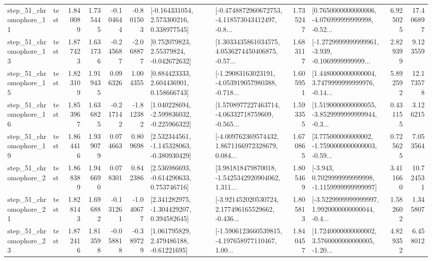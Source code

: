 \begin{tabular}{llrrrrllrlrr}
   step\_51\_chromophore\_11 &      test &      1.840089 &    1.735445 &     -0.104644 & -0.801503 &    [-0.164331054, 2.573300216, 0.338977545] &  [-0.4748872960672753, -4.118573043412497, -0.8... &       1.735247 &  [0.7650000000000006, -4.076999999999998, -0.52... &            6.925025 &         17.406897 \\
   step\_51\_chromophore\_13 &      test &      1.877423 &    1.631736 &     -0.245687 & -2.068877 &     [0.752079823, 2.55379824, -0.042672632] &  [1.3033435861034575, 4.0536274450406875, -0.57... &       1.683117 &  [-1.2729999999999961, -3.939, -0.1069999999999... &            2.829399 &          9.123559 \\
   step\_51\_chromophore\_15 &      test &      1.823109 &    1.919435 &      0.096326 &  1.004355 &     [0.884423333, 2.604436901, 0.158666743] &  [-1.29083163023191, -4.053919057980388, -0.718... &       1.605951 &  [1.4480000000000004, 3.7479999999999976, -0.14... &            5.892592 &         12.173578 \\
   step\_51\_chromophore\_16 &      test &      1.853967 &    1.636825 &     -0.217142 & -1.812382 &   [1.040228694, -2.599836032, -0.225966322] &  [1.5708977227463714, -4.06332718759609, -0.565... &       1.593355 &  [1.5190000000000055, -3.8529999999999944, -0.3... &            0.431155 &          3.126215 \\
   step\_51\_chromophore\_19 &      test &      1.864416 &    1.939079 &      0.074663 &  0.809698 &   [2.532344561, -1.145328063, -0.380930429] &  [-4.009762369574432, 1.8671166972328679, 0.084... &       1.670865 &  [3.775000000000002, -1.7590000000000003, -0.59... &            0.725625 &          7.053564 \\
    step\_51\_chromophore\_2 &      test &      1.868389 &    1.946690 &      0.078301 &  0.842386 &    [2.536986693, -0.614290633, 0.753746716] &  [3.981818479870018, -1.5425342920904062, 1.311... &       1.805469 &  [-3.943, 0.7029999999999998, -1.1159999999999997] &            3.411660 &         10.724531 \\
   step\_51\_chromophore\_21 &      test &      1.828143 &    1.696882 &     -0.131261 & -1.040677 &    [2.341282975, -1.304429207, 0.394582645] &  [-3.921452020530724, 2.177496165529662, -0.436... &       1.805813 &  [-3.5229999999999997, 1.9920000000000044, -0.4... &            1.582602 &          1.345807 \\
   step\_51\_chromophore\_23 &      test &      1.872416 &    1.813598 &     -0.058818 & -0.389729 &     [1.061795829, 2.479486188, -0.61221695] &  [-1.5906123660539815, -4.197658977110467, 1.00... &       1.840457 &  [1.7240000000000002, 3.5760000000000005, -1.20... &            4.829352 &          6.458012 \\

\end{tabular}
